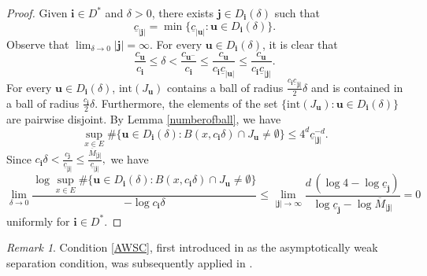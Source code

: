 \documentclass[12pt]{amsart}
\numberwithin{equation}{section}
\theoremstyle{plain}
\theoremstyle{remark}
\newtheorem{remark}[theorem]{Remark}
\theoremstyle{definition}
\newcommand{\om}{\overline{M}}
\newcommand{\iii}{\mathbf{i}}
\newcommand{\jjj}{\mathbf{j}}
\newcommand{\bu}{\mathbf{u}}
\newcommand{\de}{\delta}
\newcommand{\uc}{\underline{c}}
\renewcommand{\le}{\leqslant}
\begin{document}
	\begin{proof}
		Given $\iii\in D^*$ and  $\de>0$, there exists  $\jjj\in D_\iii(\de)$ such that 
		\[
		\uc_{|\jjj|}=\min\{\uc_{|\bu|}:\bu\in D_{\iii}(\de)\}.
		\]
		Observe that  $\lim_{\delta \to 0} |\jjj| =\infty$. For every $\bu\in D_{\iii}(\de)$, it is clear that 
		\[
		\frac{c_{\bu}}{c_{\iii}}\le \de<\frac{c_{\bu^-}}{c_\iii}\le\frac{c_{\bu}}{c_\iii \uc_{|\bu|}}\le\frac{c_{\bu}}{c_{\iii}\uc_{|\jjj|}}.
		\]
		For every $\bu\in D_{\iii}(\de)$, $\mbox{int}(J_{\bu})$ contains a ball of  radius $\frac{c_\iii \uc_{|\jjj|}}2\de$ and is contained in a ball of radius $\frac{c_\iii}2\de$.      Furthermore, the elements of the set $\{\mbox{int}(J_\bu):\bu\in D_\iii(\de)\}$ are pairwise disjoint.  
		By Lemma \ref{numberofball}, we have
		\[
		\sup_{x\in E}\#\{\bu\in D_{\iii}(\de):B(x,c_\iii\de)\cap J_{\bu}\neq \emptyset\}\le 4^d  \uc_{|\jjj|}^{-d}.
		\]
		Since  $	c_\iii\de<\frac{c_{\jjj}}{\uc_{|\jjj|}}\le\frac{\om_{|\jjj|}}{ \uc_{|\jjj|}},  $   we have 
		\begin{equation*}
			\lim_{\de\to 0}\frac{\log \sup_{x\in E}\#\{\bu\in D_{\iii}(\de):B(x,c_{\iii}\de)\cap J_{\bu}\neq \emptyset\}}{-\log c_\iii\de}\le\lim_{|\jjj|\to\infty}\frac{d\,(\log4-\log \uc_\jjj)}{\log \uc_\jjj-\log \om_{|\jjj|}}=0
		\end{equation*}
		uniformly for $\iii\in D^*$.
	\end{proof}
	

	\begin{remark}
	Condition \eqref{AWSC}, first introduced in \cite{AWSC1} as the asymptotically weak separation condition, was subsequently applied in \cite{AWSC2,AWSC3}.
	\end{remark}
\end{document}
